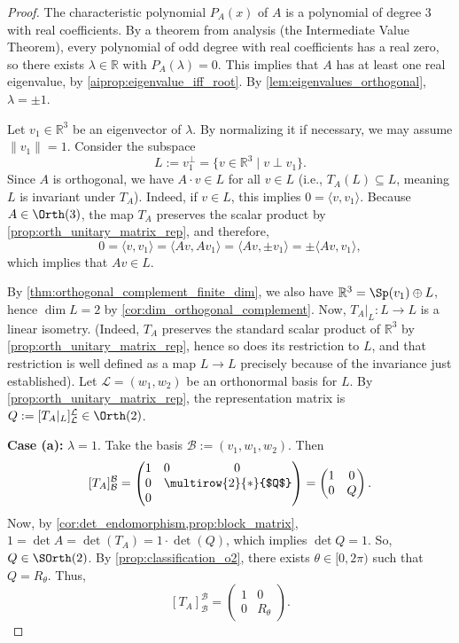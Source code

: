 \begin{proof}
The characteristic polynomial $P_A(x)$ of $A$ is a polynomial of degree $3$ with real coefficients. By a theorem from analysis (the Intermediate Value Theorem), every polynomial of odd degree with real coefficients has a real zero, so there exists $\lambda \in \mathbb{R}$ with $P_A(\lambda) = 0$. This implies that $A$ has at least one real eigenvalue, by \cref{aiprop:eigenvalue_iff_root}.
By \cref{lem:eigenvalues_orthogonal}, $\lambda = \pm 1$.

Let $v_1 \in \mathbb{R}^3$ be an eigenvector of $\lambda$. By normalizing it if necessary, we may assume $\|v_1\| = 1$. Consider the subspace
\[ L := v_1^\perp = \{v \in \mathbb{R}^3 \mid v \perp v_1\}. \]
Since $A$ is orthogonal, we have $A \cdot v \in L$ for all $v \in L$ (i.e., $T_A(L) \subseteq L$, meaning $L$ is invariant under $T_A$).
Indeed, if $v \in L$, this implies $0 = \langle v, v_1 \rangle$. Because $A \in \Orth(3)$, the map $T_A$ preserves the scalar product by \cref{prop:orth_unitary_matrix_rep}, and therefore,
\[ 0 = \langle v, v_1 \rangle = \langle Av, Av_1 \rangle = \langle Av, \pm v_1 \rangle = \pm \langle Av, v_1 \rangle, \]
which implies that $Av \in L$.

By \cref{thm:orthogonal_complement_finite_dim}, we also have $\mathbb{R}^3 = \Sp(v_1) \oplus L$, hence $\dim L = 2$ by \cref{cor:dim_orthogonal_complement}.
Now, $T_A|_L \colon L \to L$ is a linear isometry.
(Indeed, $T_A$ preserves the standard scalar product of $\mathbb{R}^3$ by \cref{prop:orth_unitary_matrix_rep}, hence so does its restriction to $L$, and that restriction is well defined as a map $L \to L$ precisely because of the invariance just established).
Let $\mathcal{L} = (w_1, w_2)$ be an orthonormal basis for $L$. By \cref{prop:orth_unitary_matrix_rep}, the representation matrix is $Q := [T_A|_L]_{\mathcal{L}}^{\mathcal{L}} \in \Orth(2)$.

\textbf{Case (a):} $\lambda = 1$. Take the basis $\mathcal{B} := (v_1, w_1, w_2)$. Then
\[ [T_A]_{\mathcal{B}}^{\mathcal{B}} = \begin{pmatrix} 1 & 0 & 0 \\ 0 & \multicolumn{2}{c}{\multirow{2}{*}{$Q$}} \\ 0 & & \end{pmatrix} = \begin{pmatrix} 1 & 0 \\ 0 & Q \end{pmatrix}. \]
Now, by \cref{cor:det_endomorphism,prop:block_matrix}, $1 = \det A = \det(T_A) = 1 \cdot \det(Q)$, which implies $\det Q = 1$. 
So, $Q \in \SOrth(2)$. By \cref{prop:classification_o2}, there exists $\theta \in [0, 2\pi)$ such that $Q = R_\theta$.
Thus,
\[ [T_A]_{\mathcal{B}}^{\mathcal{B}} = \begin{pmatrix} 1 & 0 \\ 0 & R_\theta \end{pmatrix}. \]


\end{proof}
